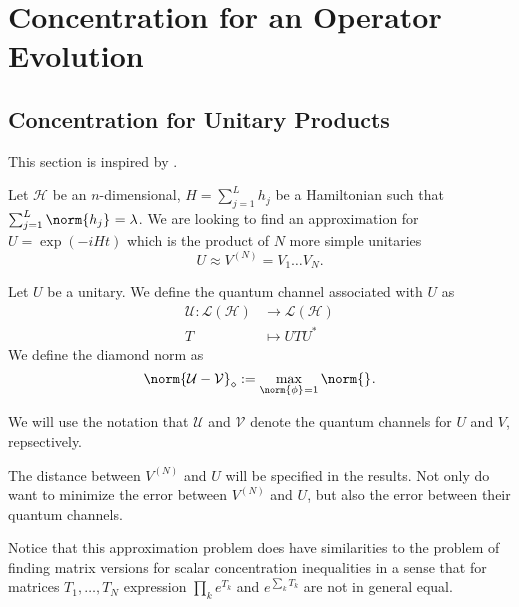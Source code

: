 \newpage

\section{Concentration for an Operator Evolution}


\subsection{Concentration for Unitary Products}

This section is inspired by \cite{chen2021product}.

Let \( \mathcal{H} \) be an \( n \)-dimensional, \( H= \sum_{j=1}^{L} h_j \) be a Hamiltonian such that \( \sum_{j=1}^{L} \norm{h_j}_{}= \lambda \). We are looking to find an approximation for \( U= \operatorname{exp}\left(-iHt\right) \) which is the product of \( N \) more simple unitaries
\[ U \approx V^{(N)} = V_1 \dots V_N .\]

\begin{defn}
    Let \( U \) be a unitary. We define the quantum channel associated with \( U \) as 
    \begin{align*}
      \mathcal{U}: \mathcal{L}(\mathcal{H}) &\to \mathcal{L}(\mathcal{H}) \\
                                          T  &\mapsto UTU^{*}
    \end{align*}
    We define the diamond norm as 
    \[ \norm{\mathcal{U}-\mathcal{V}}_{\diamond}:= \max_{\norm{\phi }_{}=1} \norm{}_{} .\]
\end{defn}

We will use the notation that \( \mathcal{U}\) and \( \mathcal{V}  \) denote the quantum channels for \( U \) and \( V \), repsectively.

The distance between \( V^{(N)} \) and \( U \) will be specified in the results. Not only do want to minimize the error between \( V^{(N)} \) and \( U \), but also the error between their quantum channels.

Notice that this approximation problem does have similarities to the problem of finding matrix versions for scalar concentration inequalities in a sense that for matrices \( T_1,\dots, T_N \) expression \( \prod_k e^{T_k} \) and \( e^{\sum_k T_k} \) are not in general equal.

